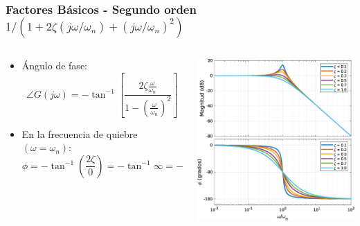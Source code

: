 \documentclass[aspectratio=169, handout]{beamer}
\theoremstyle{definition}
\theoremstyle{plain}
\theoremstyle{remark}
\begin{document}
\begin{frame}[<+->]\frametitle{Factores Básicos - Segundo orden $1/(1+2\zeta(j\omega/\omega_n)+(j\omega/\omega_n)^2)$}
\vspace*{7mm}
\begin{columns}
	\begin{column}{0.5\textwidth}
	\begin{itemize}
		\item Ángulo de fase:
		\begin{equation*}
			\angle G(j\omega) = -\tan^{-1} \left[\frac{2\zeta\frac{\omega}{\omega_n}}{1-\left(\frac{\omega}{\omega_n}\right)^2} \right]
		\end{equation*}
		\item En la frecuencia de quiebre $(\omega = \omega_n)$:
		\begin{equation*}
			\phi = -\tan^{-1}\left(\frac{2\zeta}{0}\right) = -\tan^{-1}\infty = -\ang{90}
		\end{equation*}
	\end{itemize}
	\end{column}
	\begin{column}{0.5\textwidth}
	\centering
	\includegraphics[width=6.5cm]{images/bodeSecondOrderIntegral.eps}
	\end{column}
\end{columns}
\end{frame}
\end{document}
